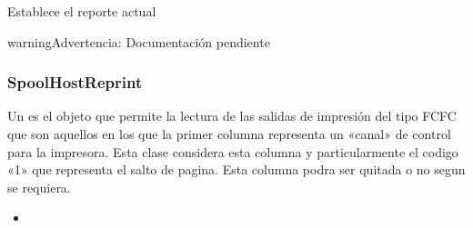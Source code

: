 \documentclass[a4paper,12pt,spanish]{sphinxmanual}
\begin{document}
\begin{fulllineitems}
\begin{fulllineitems}
\label{\detokenize{openerm.Database:openerm.Database.Database.set_report}}
Establece el reporte actual

\begin{sphinxadmonition}{warning}{Advertencia:}
Documentación pendiente
\end{sphinxadmonition}

\end{fulllineitems}


\end{fulllineitems}



\subsubsection{SpoolHostReprint}
\label{\detokenize{openerm.SpoolHostReprint:module-openerm.SpoolHostReprint}}\label{\detokenize{openerm.SpoolHostReprint:spoolhostreprint}}\label{\detokenize{openerm.SpoolHostReprint::doc}}
Un  es el objeto que permite la lectura de las salidas de
impresión del tipo FCFC que son aquellos en los que la primer columna
representa un «canal» de control para la impresora. Esta clase considera esta
columna  y particularmente el codigo «1» que representa el salto de pagina.
Esta columna podra ser quitada o no segun se requiera.



\begin{itemize}
\item {} 
{\hyperref[\detokenize{openerm.SpoolFixedRecordLength:module-openerm.SpoolFixedRecordLength}]{}}

\end{itemize}


\end{document}
